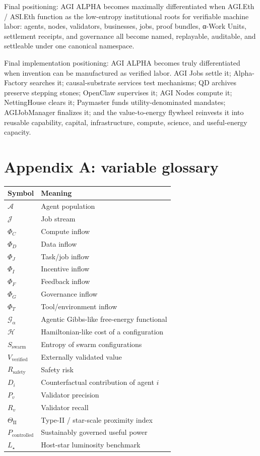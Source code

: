 \documentclass[
  11pt,
]{article}
\begin{document}
Final positioning: AGI ALPHA becomes maximally differentiated when
AGI.Eth / ASI.Eth function as the low-entropy institutional roots for
verifiable machine labor: agents, nodes, validators, businesses, jobs,
proof bundles, α-Work Units, settlement receipts, and governance all
become named, replayable, auditable, and settleable under one canonical
namespace.

Final implementation positioning: AGI ALPHA becomes truly differentiated
when invention can be manufactured as verified labor. AGI Jobs settle
it; Alpha-Factory searches it; causal-substrate services test
mechanisms; QD archives preserve stepping stones; OpenClaw supervises
it; AGI Nodes compute it; NettingHouse clears it; Paymaster funds
utility-denominated mandates; AGIJobManager finalizes it; and the
value-to-energy flywheel reinvests it into reusable capability, capital,
infrastructure, compute, science, and useful-energy capacity.

\section{Appendix A: variable
glossary}\label{appendix-a-variable-glossary}

\begin{longtable}[]{@{}ll@{}}
\toprule\noalign{}
Symbol & Meaning \\
\midrule\noalign{}
\endhead
\bottomrule\noalign{}
\endlastfoot
\(\mathcal{A}\) & Agent population \\
\(\mathcal{J}\) & Job stream \\
\(\Phi_C\) & Compute inflow \\
\(\Phi_D\) & Data inflow \\
\(\Phi_J\) & Task/job inflow \\
\(\Phi_I\) & Incentive inflow \\
\(\Phi_F\) & Feedback inflow \\
\(\Phi_G\) & Governance inflow \\
\(\Phi_T\) & Tool/environment inflow \\
\(\mathcal{G}_{\alpha}\) & Agentic Gibbs-like free-energy functional \\
\(\mathcal{H}\) & Hamiltonian-like cost of a configuration \\
\(S_{\text{swarm}}\) & Entropy of swarm configurations \\
\(V_{\text{verified}}\) & Externally validated value \\
\(R_{\text{safety}}\) & Safety risk \\
\(D_i\) & Counterfactual contribution of agent \(i\) \\
\(P_v\) & Validator precision \\
\(R_v\) & Validator recall \\
\(\Theta_{\mathrm{II}}\) & Type-II / star-scale proximity index \\
\(P_{\text{controlled}}\) & Sustainably governed useful power \\
\(L_{\star}\) & Host-star luminosity benchmark \\
\end{longtable}
\end{document}
